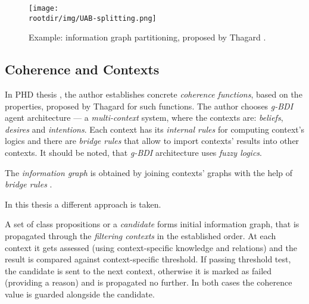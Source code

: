 \documentclass[ThesisDoc]{subfiles}
\begin{document}
\begin{figure}[h]
  \centering
  \texttt{[image: \\rootdir/img/UAB-splitting.png]} %
  \caption{Example: information graph partitioning, proposed by Thagard
           \cite{ThagVerb98, UAB-Thesis}. }
  \label{fig:UAB-partition}
\end{figure}



\subsection{Coherence and Contexts}
\label{sec:coherence}

In PHD thesis \cite{UAB-Thesis}, the author establishes concrete
\emph{coherence functions}, based on the properties, proposed by Thagard for
such functions. The author chooses \emph{g-BDI} agent architecture ---
a \emph{multi-context} system, where the contexts are: \emph{beliefs},
\emph{desires} and \emph{intentions}. Each context has its \emph{internal rules}
for computing context's logics and there are \emph{bridge rules} that allow to
import contexts' results into other contexts. It should be noted, that \emph{g-BDI}
architecture uses \emph{fuzzy logics}.

The \emph{information graph} is obtained by joining contexts' graphs with the
help of \emph{bridge rules}  \cite[62]{UAB-Thesis}.

\bigskip

\medskip

\noindent
In this thesis a different approach is taken.

A set of class propositions or a \emph{candidate} forms initial information graph,
that is propagated through the \emph{filtering contexts} in the established
order. At each context it gets assessed
(using context-specific knowledge and relations)
and the result is compared against context-specific threshold.
If passing threshold test,
the candidate is sent to the next context, otherwise it is marked as failed
(providing a reason) and is propagated no further. In both cases the coherence
value is guarded alongside the candidate.
\end{document}
